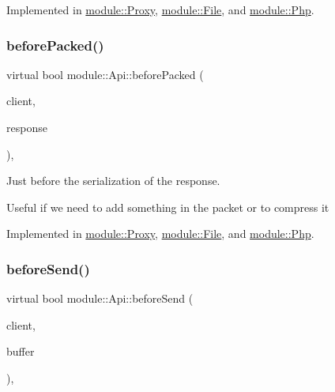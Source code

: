 Implemented in \hyperlink{classmodule_1_1Proxy_a16524232b12bd03353c79bcda4bd8d15}{module\+::\+Proxy}, \hyperlink{classmodule_1_1File_a201c3c9c01df460e22f270c554937639}{module\+::\+File}, and \hyperlink{classmodule_1_1Php_ae3f23ea75718c51e0427fa2d13ab9755}{module\+::\+Php}.

\mbox{\label{structmodule_1_1Api_a5293babe6b28a397b7a11f32da0a6f51}} 
\subsubsection{\texorpdfstring{before\+Packed()}{beforePacked()}}
{\footnotesize\ttfamily virtual bool module\+::\+Api\+::before\+Packed (\begin{DoxyParamCaption}\item[{const \hyperlink{structnet_1_1IClient}{net\+::\+I\+Client} \&}]{client,  }\item[{\hyperlink{structhttp_1_1IResponse}{http\+::\+I\+Response} \&}]{response }\end{DoxyParamCaption})\hspace{0.3cm}{\ttfamily [pure virtual]}, {\ttfamily [noexcept]}}



Just before the serialization of the response. 

Useful if we need to add something in the packet or to compress it 

Implemented in \hyperlink{classmodule_1_1Proxy_a3b88487ecaaa856f319d78f2aa6358c1}{module\+::\+Proxy}, \hyperlink{classmodule_1_1File_ab2004b38d5dd63e0e19f358a3820477f}{module\+::\+File}, and \hyperlink{classmodule_1_1Php_a71b22ae01eedfd3406d01907cd7dc3d9}{module\+::\+Php}.

\mbox{\label{structmodule_1_1Api_a71d1ada8bc5fc81fd71607315dd86185}} 
\subsubsection{\texorpdfstring{before\+Send()}{beforeSend()}}
{\footnotesize\ttfamily virtual bool module\+::\+Api\+::before\+Send (\begin{DoxyParamCaption}\item[{const \hyperlink{structnet_1_1IClient}{net\+::\+I\+Client} \&}]{client,  }\item[{std\+::string \&}]{buffer }\end{DoxyParamCaption})\hspace{0.3cm}{\ttfamily [pure virtual]}, {\ttfamily [noexcept]}}



